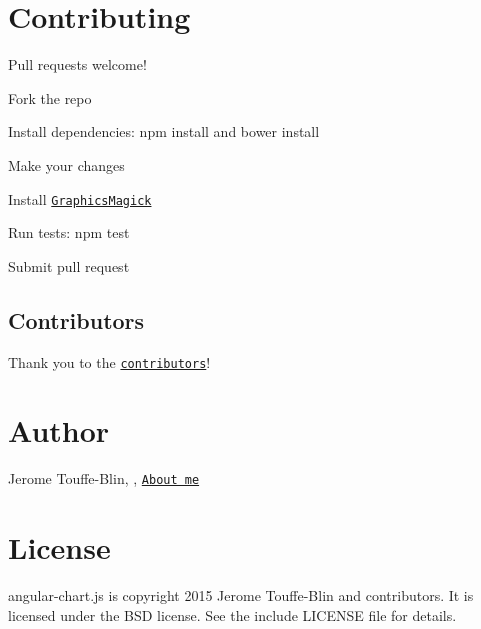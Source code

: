 \section*{Contributing}

Pull requests welcome!


\begin{DoxyEnumerate}
\item Fork the repo
\end{DoxyEnumerate}
\begin{DoxyEnumerate}
\item Install dependencies\+: {\ttfamily npm install} and {\ttfamily bower install}
\end{DoxyEnumerate}
\begin{DoxyEnumerate}
\item Make your changes
\end{DoxyEnumerate}
\begin{DoxyEnumerate}
\item Install \href{http://www.graphicsmagick.org/}{\tt Graphics\+Magick}
\end{DoxyEnumerate}
\begin{DoxyEnumerate}
\item Run tests\+: {\ttfamily npm test}
\end{DoxyEnumerate}
\begin{DoxyEnumerate}
\item Submit pull request
\end{DoxyEnumerate}

\subsection*{Contributors}

Thank you to the \href{https://github.com/jtblin/angular-chart.js/graphs/contributors}{\tt contributors}!

\section*{Author}

Jerome Touffe-\/\+Blin, \href{https://twitter.com/jtblin}{\tt }, \href{http://about.me/jtblin}{\tt About me}

\section*{License}

angular-\/chart.\+js is copyright 2015 Jerome Touffe-\/\+Blin and contributors. It is licensed under the B\+SD license. See the include L\+I\+C\+E\+N\+SE file for details. 